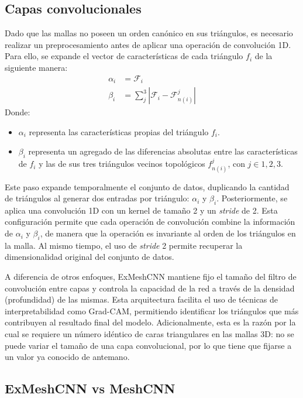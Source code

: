 \FloatBarrier
\subsection{Capas convolucionales}
Dado que las mallas no poseen un orden canónico en sus triángulos, es necesario realizar un preprocesamiento antes de aplicar una operación de convolución 1D. Para ello, se expande el vector de características de cada triángulo $f_i$ de la siguiente manera:
\begin{align}
    \alpha_i &= \mathcal{F}_{i} \\
    \beta_i &= \sum_{j}^{3} | \mathcal{F}_{i} - \mathcal{F}_{n(i)}^{j}| 
\end{align}
Donde:
\begin{itemize}
    \item $\alpha_i$ representa las características propias del triángulo $f_i$.
    \item $\beta_i$ representa un agregado de las diferencias absolutas entre las características de $f_i$ y las de sus tres triángulos vecinos topológicos $f_{n(i)}^{j}$, con $j \in {1, 2, 3}$.
\end{itemize}

Este paso expande temporalmente el conjunto de datos, duplicando la cantidad de triángulos al generar dos entradas por triángulo: $\alpha_i$ y $\beta_i$. Posteriormente, se aplica una convolución 1D con un kernel de tamaño 2 y un \textit{stride} de 2. Esta configuración permite que cada operación de convolución combine la información de $\alpha_i$ y $\beta_i$, de manera que la operación es invariante al orden de los triángulos en la malla. Al mismo tiempo, el uso de \textit{stride} 2 permite recuperar la dimensionalidad original del conjunto de datos.

A diferencia de otros enfoques, ExMeshCNN mantiene fijo el tamaño del filtro de convolución entre capas y controla la capacidad de la red a través de la densidad (profundidad) de las mismas. Esta arquitectura facilita el uso de técnicas de interpretabilidad como Grad-CAM, permitiendo identificar los triángulos que más contribuyen al resultado final del modelo. Adicionalmente, esta es la razón por la cual se requiere un número idéntico de caras triangulares en las mallas 3D: no se puede variar el tamaño de una capa convolucional, por lo que tiene que fijarse a un valor ya conocido de antemano.

\subsection{ExMeshCNN vs MeshCNN}
\label{exmeshcnn_vs_meshcnn}


